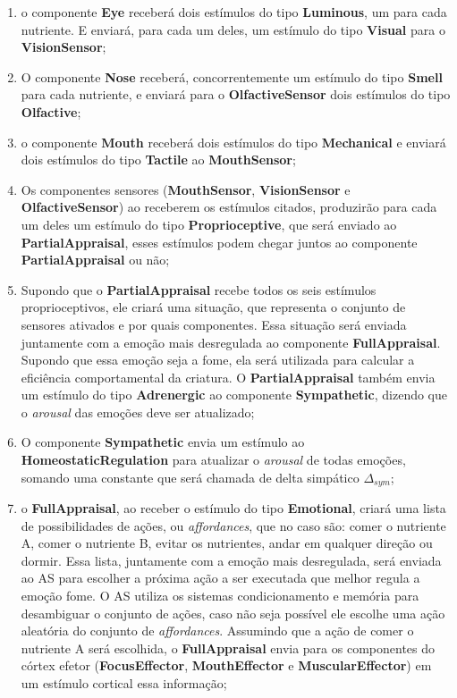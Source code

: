\begin{enumerate}
    \item o componente \textbf{Eye} receberá dois estímulos do tipo \textbf{Luminous}, um para cada nutriente. E enviará, para cada um deles, um estímulo do tipo \textbf{Visual} para o\textbf{ VisionSensor};
    \item O componente \textbf{Nose} receberá, concorrentemente um estímulo do tipo \textbf{Smell} para cada nutriente, e enviará para o \textbf{OlfactiveSensor} dois estímulos do tipo \textbf{Olfactive};
    \item o componente \textbf{Mouth} receberá dois estímulos do tipo \textbf{Mechanical} e enviará dois estímulos do tipo \textbf{Tactile} ao \textbf{MouthSensor}; 
    \item Os componentes sensores (\textbf{MouthSensor}, \textbf{VisionSensor} e \textbf{OlfactiveSensor}) ao receberem os estímulos citados, produzirão para cada um deles um estímulo do tipo \textbf{Proprioceptive}, que será enviado ao \textbf{PartialAppraisal}, esses estímulos podem chegar juntos ao componente \textbf{PartialAppraisal} ou não;
    \item Supondo que o \textbf{PartialAppraisal} recebe todos os seis estímulos proprioceptivos, ele criará uma situação, que representa o conjunto de sensores ativados e por quais componentes. Essa situação será enviada juntamente com a emoção mais desregulada ao componente \textbf{FullAppraisal}. Supondo que essa emoção seja a fome, ela será utilizada para calcular a eficiência comportamental da criatura. O \textbf{PartialAppraisal} também envia um estímulo do tipo \textbf{Adrenergic} ao componente \textbf{Sympathetic}, dizendo que o \textit{arousal} das emoções deve ser atualizado;
    \item O componente \textbf{Sympathetic} envia um estímulo ao \textbf{HomeostaticRegulation} para atualizar o \textit{arousal} de todas emoções, somando uma constante que será chamada de delta simpático $ \Delta_{sym} $;
    \item o \textbf{FullAppraisal}, ao receber o estímulo do tipo \textbf{Emotional}, criará uma lista de possibilidades de ações, ou \textit{affordances}, que no caso são: comer o nutriente A, comer o nutriente B, evitar os nutrientes, andar em qualquer direção ou dormir. Essa lista, juntamente com a emoção mais desregulada, será enviada ao AS para escolher a próxima ação a ser executada que melhor regula a emoção fome. O AS utiliza os sistemas condicionamento e memória para desambiguar o conjunto de ações, caso não seja possível ele escolhe uma ação aleatória do conjunto de \textit{affordances}.  Assumindo que a ação de comer o nutriente A será escolhida, o \textbf{FullAppraisal} envia para os componentes do córtex efetor  (\textbf{FocusEffector}, \textbf{MouthEffector} e \textbf{MuscularEffector}) em um estímulo cortical essa informação;

\end{enumerate}
